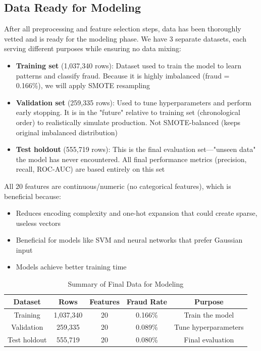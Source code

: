 \subsection{Data Ready for Modeling}

After all preprocessing and feature selection steps, data has been thoroughly vetted and is ready for the modeling phase. We have 3 separate datasets, each serving different purposes while ensuring no data mixing:

\begin{itemize}
    \item \textbf{Training set} (1,037,340 rows): Dataset used to train the model to learn patterns and classify fraud. Because it is highly imbalanced (fraud = 0.166\%), we will apply SMOTE resampling
    \item \textbf{Validation set} (259,335 rows): Used to tune hyperparameters and perform early stopping. It is in the "future" relative to training set (chronological order) to realistically simulate production. Not SMOTE-balanced (keeps original imbalanced distribution)
    \item \textbf{Test holdout} (555,719 rows): This is the final evaluation set---"unseen data" the model has never encountered. All final performance metrics (precision, recall, ROC-AUC) are based entirely on this set
\end{itemize}

All 20 features are continuous/numeric (no categorical features), which is beneficial because:
\begin{itemize}
    \item Reduces encoding complexity and one-hot expansion that could create sparse, useless vectors
    \item Beneficial for models like SVM and neural networks that prefer Gaussian input
    \item Models achieve better training time
\end{itemize}

\begin{table}[h]
\centering
\caption{Summary of Final Data for Modeling}
\begin{tabular}{|c|c|c|c|c|}
\hline
\textbf{Dataset} & \textbf{Rows} & \textbf{Features} & \textbf{Fraud Rate} & \textbf{Purpose} \\
\hline
Training & 1,037,340 & 20 & 0.166\% & Train the model \\
\hline
Validation & 259,335 & 20 & 0.089\% & Tune hyperparameters \\
\hline
Test holdout & 555,719 & 20 & 0.080\% & Final evaluation \\
\hline
\end{tabular}
\end{table}



